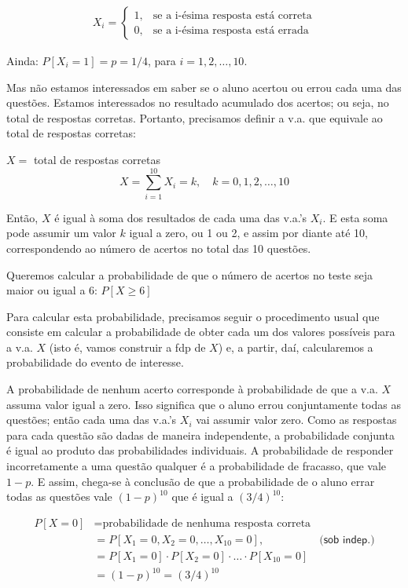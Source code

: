 \documentclass[
]{book}
\theoremstyle{definition}
\theoremstyle{definition}
\theoremstyle{definition}
\theoremstyle{remark}
\begin{document}
\begin{align*}
X_i = \left\{
  \begin{array}{rl}
    1, & \text{se a i-ésima resposta está correta}\\
    0, & \text{se a i-ésima resposta está errada}
  \end{array}\right.
\end{align*}

Ainda: \(P[X_i = 1] = p = 1/4\), para \(i = 1, 2, \ldots, 10\).

Mas não estamos interessados em saber se o aluno acertou ou errou cada uma das questões. Estamos interessados no resultado acumulado dos acertos; ou seja, no total de respostas corretas. Portanto, precisamos definir a v.a. que equivale ao total de respostas corretas:

\(X =\) total de respostas corretas\\
\[X = \sum_{i=1}^{10}X_i = k, \quad k = 0, 1, 2, \ldots, 10\]

Então, \(X\) é igual à soma dos resultados de cada uma das v.a.'s \(X_i\). E esta soma pode assumir um valor \(k\) igual a zero, ou 1 ou 2, e assim por diante até 10, correspondendo ao número de acertos no total das 10 questões.

Queremos calcular a probabilidade de que o número de acertos no teste seja maior ou igual a 6: \(P[X \geq 6]\)

Para calcular esta probabilidade, precisamos seguir o procedimento usual que consiste em calcular a probabilidade de obter cada um dos valores possíveis para a v.a. \(X\) (isto é, vamos construir a fdp de \(X\)) e, a partir, daí, calcularemos a probabilidade do evento de interesse.

A probabilidade de nenhum acerto corresponde à probabilidade de que a v.a. \(X\) assuma valor igual a zero. Isso significa que o aluno errou conjuntamente todas as questões; então cada uma das v.a.'s \(X_i\) vai assumir valor zero. Como as respostas para cada questão são dadas de maneira independente, a probabilidade conjunta é igual ao produto das probabilidades individuais. A probabilidade de responder incorretamente a uma questão qualquer é a probabilidade de fracasso, que vale \(1-p\). E assim, chega-se à conclusão de que a probabilidade de o aluno errar todas as questões vale \((1-p)^{10}\) que é igual a \((3/4)^{10}\):

\begin{align*}
P[X=0]   &= \text{probabilidade de nenhuma resposta correta}\\
         &= P[X_1 = 0, X_2 = 0, \ldots, X_{10}=0],  & \textsf{(sob indep.)} \\
         &= P[X_1 = 0]\cdot P[X_2 = 0]\cdot \ldots \cdot P[X_{10} = 0]\\
         &= (1-p)^{10} = \left(3/4\right)^{10}
\end{align*}
\end{document}
